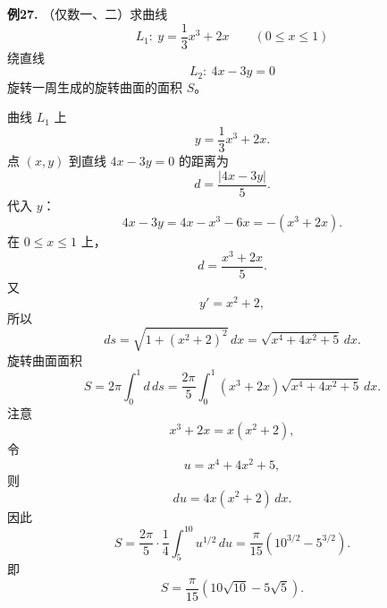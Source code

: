 \begin{problemblock}
\textbf{例27.} （仅数一、二）求曲线
\[
L_1:\ y=\frac13x^3+2x\qquad (0\le x\le1)
\]
绕直线
\[
L_2:\ 4x-3y=0
\]
旋转一周生成的旋转曲面的面积 \(S\)。
\end{problemblock}
\begin{solutionblock}
曲线 \(L_1\) 上
\[
y=\frac13x^3+2x.
\]
点 \((x,y)\) 到直线 \(4x-3y=0\) 的距离为
\[
d=\frac{|4x-3y|}{5}.
\]
代入 \(y\)：
\[
4x-3y=4x-x^3-6x=-(x^3+2x).
\]
在 \(0\le x\le1\) 上，
\[
d=\frac{x^3+2x}{5}.
\]
又
\[
y'=x^2+2,
\]
所以
\[
ds=\sqrt{1+(x^2+2)^2}\,dx
=\sqrt{x^4+4x^2+5}\,dx.
\]
旋转曲面面积
\[
S=2\pi\int_0^1 d\,ds
=\frac{2\pi}{5}\int_0^1 (x^3+2x)\sqrt{x^4+4x^2+5}\,dx.
\]
注意
\[
x^3+2x=x(x^2+2),
\]
令
\[
u=x^4+4x^2+5,
\]
则
\[
du=4x(x^2+2)\,dx.
\]
因此
\[
S=\frac{2\pi}{5}\cdot\frac14\int_{5}^{10}u^{1/2}\,du
=\frac{\pi}{15}\left(10^{3/2}-5^{3/2}\right).
\]
即
\[
S=\frac{\pi}{15}(10\sqrt{10}-5\sqrt5).
\]
\end{solutionblock}
